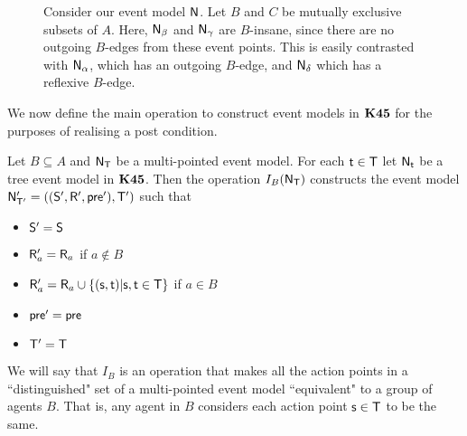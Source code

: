 \begin{figure}[ht!]
\centering
{}
\caption{Consider our event model $\mathrm{\mathsf{N}}$. Let $B$ and $C$ be mutually exclusive
  subsets of $A$. Here, $\mathrm{\mathsf{N}}_\beta$ and $\mathrm{\mathsf{N}}_\gamma$
  are $B$-insane, since there are no outgoing $B$-edges from these event points.
This is easily contrasted with $\mathrm{\mathsf{N}}_\alpha$, which has an outgoing $B$-edge,
     and $\mathrm{\mathsf{N}}_\delta$ which has a reflexive $B$-edge.}
\label{bInsaneExample}
\end{figure}

We now define the main operation to construct event models in $\bf K45$ for the
purposes of realising a post condition.

\begin{defn} \label{makeEquivalence}
	Let $B \subseteq A$ and $\mathrm{\mathsf{N}}_\mathrm{\mathsf{T}}$ be a multi-pointed event model.
  For each $\mathrm{\mathsf{t}} \in \mathrm{\mathsf{T}}$ let $\mathrm{\mathsf{N}}_\mathrm{\mathsf{t}}$ be a tree event model in $\bf K45$.
  Then the operation $I_B(\mathrm{\mathsf{N}}_\mathrm{\mathsf{T}})$ constructs the event model $\mathrm{\mathsf{N}}'_{\mathrm{\mathsf{T}}'} =
  ((\mathrm{\mathsf{S}}',\mathrm{\mathsf{R}}',\mathrm{\mathsf{pre}}'),\mathrm{\mathsf{T}}')$ such that
  \begin{itemize}
    \item $\mathrm{\mathsf{S}}' = \mathrm{\mathsf{S}}$
    \item $\mathrm{\mathsf{R}}'_a = \mathrm{\mathsf{R}}_a$ if $a \notin B$
    \item $\mathrm{\mathsf{R}}'_a = \mathrm{\mathsf{R}}_a \cup \{(\mathrm{\mathsf{s}}, \mathrm{\mathsf{t}}) | \mathrm{\mathsf{s}}, \mathrm{\mathsf{t}} \in \mathrm{\mathsf{T}}\}$ if $a
    \in B$
    \item $\mathrm{\mathsf{pre}}' = \mathrm{\mathsf{pre}}$
    \item $\mathrm{\mathsf{T}}' = \mathrm{\mathsf{T}}$
  \end{itemize}
\end{defn}

We will say that $I_B$ is an operation that makes all the action
points in a ``distinguished" set of a multi-pointed event model ``equivalent" to a
group of agents $B$.
That is, any agent in $B$ considers each action point $\mathrm{\mathsf{s}} \in \mathrm{\mathsf{T}}$ to be the
same.


